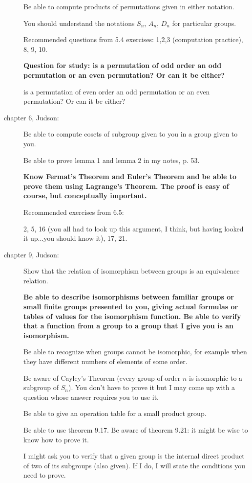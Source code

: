 \documentclass[12pt]{article}
\begin{document}
\begin{description}
{Be able to compute products of permutations given in either notation.}

You should understand the notations $S_n$, $A_n$, $D_n$ for particular groups.

Recommended questions from 5.4 exercises:  1,2,3 (computation practice), 8, 9, 10.

{\bf Question for study:  is a permutation of odd order an odd permutation or an even permutation?  Or can it be either?

is a permutation of even order an odd permutation or an even permutation?  Or can it be either?}

\item[chapter 6, Judson:]

Be able to compute cosets of  subgroup given to you in a group given to you.

Be able to prove lemma 1 and lemma 2 in my notes, p. 53.

{\bf Know Fermat's Theorem and Euler's Theorem and be able to prove them using Lagrange's Theorem.
The proof is easy of course, but conceptually important.}

Recommended exercises from 6.5:

2, 5, 16 (you all had to look up this argument, I think, but having looked it up...you should know it), 17, 21.

\item[chapter 9, Judson:]

Show that the relation of isomorphism between groups is an equivalence relation.

{\bf Be able to describe isomorphisms between familiar groups or small finite groups presented to you, giving actual formulas or tables of values for the isomorphism function.  Be able to verify that a function from a group to a group that I give you
is an isomorphism.

Be able to recognize when groups cannot be isomorphic, for example when they have different numbers of elements of some order.}

Be aware of Cayley's Theorem (every group of order $n$ is isomorphic to a subgroup of $S_n$).  You don't have to prove it but I may come up with a question whose answer requires you to use it.

Be able to give an operation table for a small product group.

Be able to use theorem 9.17.  Be aware of theorem 9.21:  it might be wise to know how to prove it.

I might ask you to verify that a given group is the internal direct product of two of its subgroups (also given).  If I do, I will state the conditions you need to prove.


\end{description}
\end{document}
